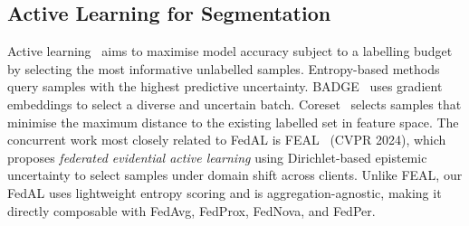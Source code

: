 \subsection{Active Learning for Segmentation}

Active learning~\cite{settles2009active} aims to maximise model accuracy
subject to a labelling budget by selecting the most informative unlabelled
samples.
Entropy-based methods~\cite{settles2009active} query samples with the
highest predictive uncertainty.
BADGE~\cite{ash2020badge} uses gradient embeddings to select a
diverse and uncertain batch.
Coreset~\cite{sener2018coreset} selects samples that minimise the maximum
distance to the existing labelled set in feature space.
The concurrent work most closely related to FedAL is FEAL~\cite{chen2024feal}
(CVPR 2024), which proposes \emph{federated evidential active learning}
using Dirichlet-based epistemic uncertainty to select samples under domain
shift across clients.
Unlike FEAL, our FedAL uses lightweight entropy scoring and is
aggregation-agnostic, making it directly composable with FedAvg, FedProx,
FedNova, and FedPer.
